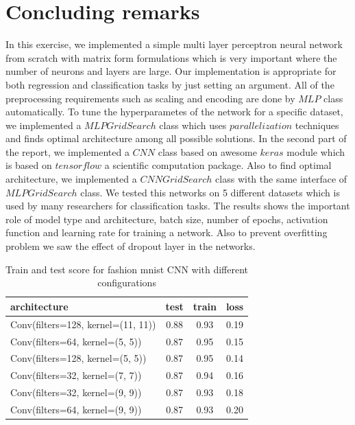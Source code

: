 \documentclass[10pt]{SelfArx} %
\begin{document}
\section{Concluding remarks}
In this exercise, we implemented a simple multi layer perceptron neural network from scratch with matrix form formulations which is very important where the number of neurons and layers are large. Our implementation is appropriate for both regression and classification tasks by just setting an argument. All of the preprocessing requirements such as scaling and encoding are done by $MLP$ class automatically. To tune the hyperparametes of the network for a specific dataset, we implemented a $MLPGridSearch$ class which uses $parallelization$ techniques and finds optimal architecture among all possible solutions. In the second part of the report, we implemented a $CNN$ class based on awesome $keras$ module which is based on $tensorflow$ a scientific computation package. Also to find optimal architecture, we implemented a $CNNGridSearch$ class with the same interface of $MLPGridSearch$ class. We tested this networks on 5 different datasets which is used by many researchers for classification tasks. The results shows the important role of model type and architecture, batch size, number of epochs, activation function and learning rate for training a network. Also to prevent overfitting problem we saw the effect of dropout layer in the networks.
\begin{table}[]
	\begin{tabular*}{1\linewidth}{@{\extracolsep{\fill} }lccc@{}}
		\toprule
		architecture & test & train & loss \\ \midrule
		Conv(filters=128, kernel=(11, 11)) & 0.88 & 0.93 & 0.19 \\
		Conv(filters=64, kernel=(5, 5)) & 0.87 & 0.95 & 0.15 \\
		Conv(filters=128, kernel=(5, 5)) & 0.87 & 0.95 & 0.14 \\
		Conv(filters=32, kernel=(7, 7)) & 0.87 & 0.94 & 0.16 \\
		Conv(filters=32, kernel=(9, 9)) & 0.87 & 0.93 & 0.18 \\
		Conv(filters=64, kernel=(9, 9)) & 0.87 & 0.93 & 0.20 \\ \bottomrule
	\end{tabular*}
	\caption{Train and test score for fashion mnist CNN  with different configurations}
	\label{tfashion1}
\end{table}
\end{document}
